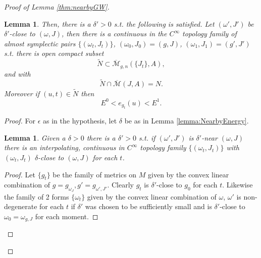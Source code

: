 \documentclass{amsart}
\numberwithin{equation}{section}
\newtheorem{lemma}[equation]{Lemma}
\theoremstyle{definition}
\theoremstyle{remark}
\begin{document}
\begin{proof} [Proof of Lemma  \ref{thm:nearbyGW}]
\begin{lemma}
 Then, there is a $\delta'>0$ s.t. the following is satisfied.
    Let $(\omega',J')$  be $\delta'$-close to
    $(\omega,J)$, then there is a continuous in the $C ^{\infty} $ topology family of almost symplectic pairs $\{(\omega _{t} , J _{t}  )\}$,
    $(\omega _{0}, J_0)= (g, J)$,  $(\omega _{1}, J_1)= (g', J')$
    s.t. there is open compact subset 
 \begin{equation*}
  \widetilde{N}  \subset \overline{\mathcal{M}} _{g,n}  (\{J _{t}\},A),
 \end{equation*}
 and
 with $$\widetilde{N}  \cap \overline{\mathcal{M}} (J,A) = N.
 $$
    Moreover  if $(u,t) \in \widetilde{N} 
       $        then $$E ^{0}    < e _{g _{t} }  (u) < E ^{1}.
      $$
 \end{lemma}
 \begin{proof} For $\epsilon$ as in the hypothesis, let $\delta$ be as in Lemma \ref{lemma:NearbyEnergy}. 
\begin{lemma} \label{lemma:Ret} Given a $\delta>0$  there is a $\delta'>0$ s.t. if $(\omega',J')$ is $\delta'$-near $(\omega, J)$ there is an interpolating, continuous in $C ^{\infty} $ topology family $\{(\omega _{t}, J _{t}  )\}$ with $(\omega _{t},J _{t}  )$ $\delta$-close to $(\omega,J)$ for each $t$.
\end{lemma}
\begin{proof}    Let $\{g _{t} \} $ be the family of metrics on $M$ given by the convex linear combination of $g=g _{\omega _{J} } ,g' = g _{\omega',J'}  $. Clearly $g _{t} $ is $\delta'$-close to $g _{0} $ for each $t$. Likewise the family of 2 forms $\{\omega _{t} \}$ given by the convex linear combination of $\omega $, $\omega'$ is non-degenerate for each $t$ if $\delta'$ was chosen to be sufficiently small and 
is $\delta'$-close to $\omega _{0} = \omega _{g,J}  $ for each moment.


\end{proof}
\end{proof}
\end{proof}
\end{document}
